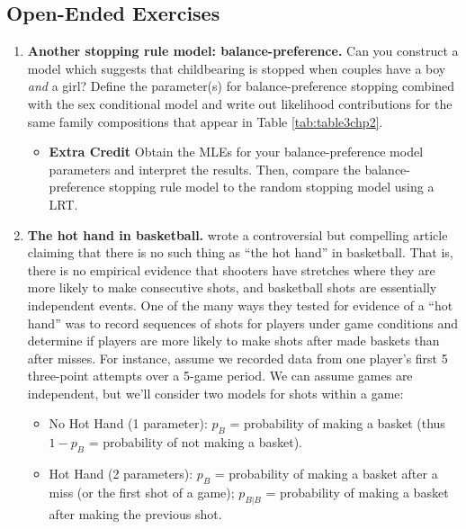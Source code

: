 \documentclass[
]{krantz}
\providecommand{\tightlist}{%
  \setlength{\itemsep}{0pt}\setlength{\parskip}{0pt}}
\begin{document}
\subsection{Open-Ended Exercises}\label{open-ended-exercises-1}

\begin{enumerate}
\def\labelenumi{\arabic{enumi}.}
\item
  \textbf{Another stopping rule model: balance-preference.}
  Can you construct a model which suggests that childbearing is stopped when couples have a boy \emph{and} a girl? Define the parameter(s) for balance-preference stopping combined with the sex conditional model and write out likelihood contributions for the same family compositions that appear in Table \ref{tab:table3chp2}.

  \begin{itemize}
  \tightlist
  \item
    \textbf{Extra Credit} Obtain the MLEs for your balance-preference model parameters and interpret the results. Then, compare the balance-preference stopping rule model to the random stopping model using a LRT.
  \end{itemize}
\item
  \textbf{The hot hand in basketball.} \citet{Gilovich1985} wrote a controversial but compelling article claiming that there is no such thing as ``the hot hand'' in basketball. That is, there is no empirical evidence that shooters have stretches where they are more likely to make consecutive shots, and basketball shots are essentially independent events. One of the many ways they tested for evidence of a ``hot hand'' was to record sequences of shots for players under game conditions and determine if players are more likely to make shots after made baskets than after misses. For instance, assume we recorded data from one player's first 5 three-point attempts over a 5-game period. We can assume games are independent, but we'll consider two models for shots within a game:

  \begin{itemize}
  \item
    No Hot Hand (1 parameter): \(p_B\) = probability of making a basket (thus \(1-p_B\) = probability of not making a basket).
  \item
    Hot Hand (2 parameters): \(p_B\) = probability of making a basket after a miss (or the first shot of a game); \(p_{B|B}\) = probability of making a basket after making the previous shot.
  \end{itemize}


\end{enumerate}
\end{document}
